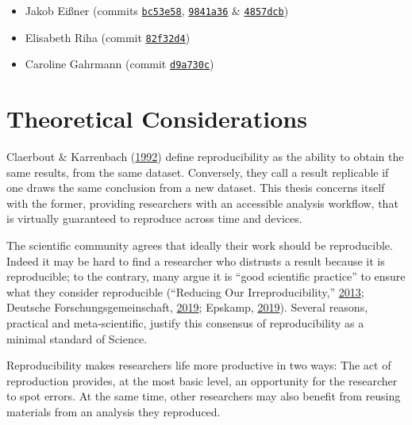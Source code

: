 \documentclass[12pt,a4paper,twoside]{article}
\providecommand{\tightlist}{%
  \setlength{\itemsep}{0pt}\setlength{\parskip}{0pt}}
\begin{document}
\begin{itemize}
\tightlist
\item
  Jakob Eißner (commits \href{https://github.com/aaronpeikert/repro-thesis/commit/bc53e58cf1861b4dbc4447853ad7f3895dd805ea}{\texttt{bc53e58}}, \href{https://github.com/aaronpeikert/repro-thesis/commit/9841a3695b9bc607b95e06e3d30b45116c6681ab}{\texttt{9841a36}} \& \href{https://github.com/aaronpeikert/repro-thesis/commit/4857dcb8536136efa63bbe5efb2da6ae6fc10681}{\texttt{4857dcb}})
\item
  Elisabeth Riha (commit \href{https://github.com/aaronpeikert/repro-thesis/commit/82f32d4d15dd3014dc0cf847166e0b023ea11a8a}{\texttt{82f32d4}})
\item
  Caroline Gahrmann (commit \href{https://github.com/aaronpeikert/repro-thesis/commit/d9a730cb1bdcedef3312bc2be32ad81a3d2a45b9}{\texttt{d9a730c}})
\end{itemize}

\newpage

\hypertarget{theoretical-considerations}{%
\section{Theoretical Considerations}\label{theoretical-considerations}}

Claerbout \& Karrenbach (\protect\hyperlink{ref-claerboutElectronicDocumentsGive1992}{1992}) define reproducibility as the ability to obtain the same results, from the same dataset.
Conversely, they call a result replicable if one draws the same conclusion from a new dataset.
This thesis concerns itself with the former, providing researchers with an accessible analysis workflow, that is virtually guaranteed to reproduce across time and devices.

The scientific community agrees that ideally their work should be reproducible.
Indeed it may be hard to find a researcher who distrusts a result because it is reproducible; to the contrary, many argue it is ``good scientific practice'' to ensure what they consider reproducible (``Reducing Our Irreproducibility,'' \protect\hyperlink{ref-AnnouncementReducingOur2013}{2013}; Deutsche Forschungsgemeinschaft, \protect\hyperlink{ref-dfg2019}{2019}; Epskamp, \protect\hyperlink{ref-epskamp2019rep}{2019}).
Several reasons, practical and meta-scientific, justify this consensus of reproducibility as a minimal standard of Science.

Reproducibility makes researchers life more productive in two ways:
The act of reproduction provides, at the most basic level, an opportunity for the researcher to spot errors. At the same time, other researchers may also benefit from reusing materials from an analysis they reproduced.
\end{document}
